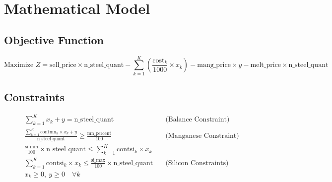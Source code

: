 \documentclass{article}
\begin{document}
\section*{Mathematical Model}

\subsection*{Objective Function}
\[
\text{Maximize } Z = \text{sell\_price} \times \text{n\_steel\_quant} - \sum_{k=1}^{K} \left( \frac{\text{cost}_k}{1000} \times x_k \right) - \text{mang\_price} \times y - \text{melt\_price} \times \text{n\_steel\_quant}
\]

\subsection*{Constraints}

\begin{align}
& \sum_{k=1}^{K} x_k + y = \text{n\_steel\_quant} \quad & \text{(Balance Constraint)} \\
& \frac{\sum_{k=1}^{K} \text{contmn}_k \times x_k + y}{\text{n\_steel\_quant}} \geq \frac{\text{mn\_percent}}{100} \quad & \text{(Manganese Constraint)} \\
& \frac{\text{si\_min}}{100} \times \text{n\_steel\_quant} \leq \sum_{k=1}^{K} \text{contsi}_k \times x_k \quad & \\
& \sum_{k=1}^{K} \text{contsi}_k \times x_k \leq \frac{\text{si\_max}}{100} \times \text{n\_steel\_quant} \quad & \text{(Silicon Constraints)} \\
& x_k \geq 0, \ y \geq 0 \quad \forall k
\end{align}
\end{document}
